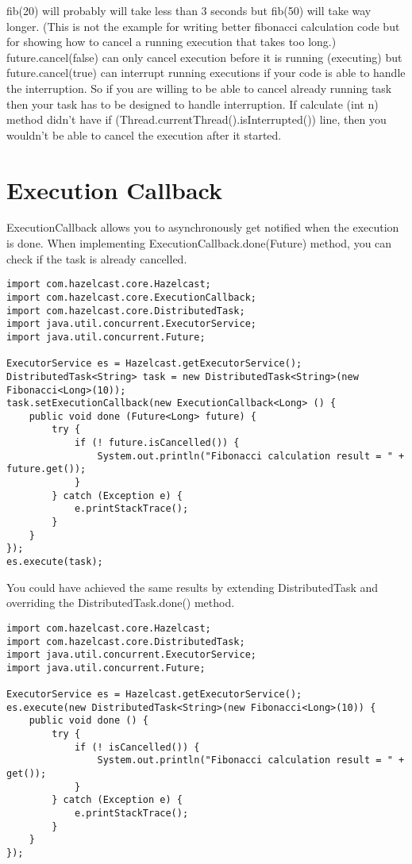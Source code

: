 fib(20) will probably will take less than 3 seconds but fib(50) will take way longer. (This is not the example for writing better fibonacci calculation code but for showing how to cancel a running execution that takes too long.) future.cancel(false) can only cancel execution before it is running (executing) but future.cancel(true) can interrupt running executions if your code is able to handle the interruption. So if you are willing to be able to cancel already running task then your task has to be designed to handle interruption. If calculate (int n) method didn't have if (Thread.currentThread().isInterrupted()) line, then you wouldn't be able to cancel the execution after it started.

\section{Execution Callback}

ExecutionCallback allows you to asynchronously get notified when the execution is done. When implementing ExecutionCallback.done(Future) method, you can check if the task is already cancelled.

\begin{verbatim}
import com.hazelcast.core.Hazelcast;
import com.hazelcast.core.ExecutionCallback;
import com.hazelcast.core.DistributedTask;
import java.util.concurrent.ExecutorService;    
import java.util.concurrent.Future; 
        
ExecutorService es = Hazelcast.getExecutorService();
DistributedTask<String> task = new DistributedTask<String>(new Fibonacci<Long>(10));
task.setExecutionCallback(new ExecutionCallback<Long> () {
    public void done (Future<Long> future) { 
        try {
            if (! future.isCancelled()) {
                System.out.println("Fibonacci calculation result = " + future.get());
            }
        } catch (Exception e) {
            e.printStackTrace();
        }
    }
});
es.execute(task);
\end{verbatim}

You could have achieved the same results by extending DistributedTask and overriding the DistributedTask.done() method.

\begin{verbatim}
import com.hazelcast.core.Hazelcast;
import com.hazelcast.core.DistributedTask;
import java.util.concurrent.ExecutorService;    
import java.util.concurrent.Future; 
        
ExecutorService es = Hazelcast.getExecutorService();
es.execute(new DistributedTask<String>(new Fibonacci<Long>(10)) {
    public void done () { 
        try {
            if (! isCancelled()) {
                System.out.println("Fibonacci calculation result = " + get());
            }
        } catch (Exception e) {
            e.printStackTrace();
        }
    }
}); 
\end{verbatim}

